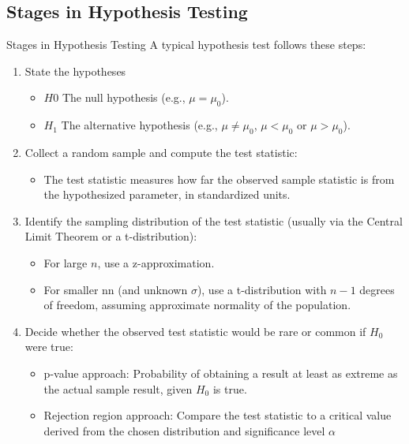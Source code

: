\documentclass[10pt]{extarticle}
\begin{document}
\subsection{Stages in Hypothesis Testing}
\begin{conceptbox}{Stages in Hypothesis Testing}{}
    A typical hypothesis test follows these steps:
    \begin{enumerate}
        \item State the hypotheses
              \begin{itemize}
                  \item $H0$ The null hypothesis (e.g., $\mu = \mu_0$).
                  \item $H_1$ The alternative hypothesis (e.g., $\mu \neq \mu_0$, $\mu < \mu_0$ or $\mu > \mu_0$).
              \end{itemize}
        \item  Collect a random sample and compute the test statistic:
              \begin{itemize}
                  \item The test statistic measures how far the observed sample statistic is from the hypothesized parameter, in standardized units.
              \end{itemize}
        \item Identify the sampling distribution of the test statistic (usually via the Central Limit Theorem or a t-distribution):
              \begin{itemize}
                  \item For large $n$, use a z-approximation.
                  \item For smaller nn (and unknown $\sigma$), use a t-distribution with $n-1$ degrees of freedom, assuming approximate normality of the population.
              \end{itemize}
        \item Decide whether the observed test statistic would be rare or common if $H_0$ were true:
              \begin{itemize}
                  \item p-value approach: Probability of obtaining a result at least as extreme as the actual sample result, given $H_0$ is true.
                  \item Rejection region approach: Compare the test statistic to a critical value derived from the chosen distribution and significance level $\alpha$
              \end{itemize}

\end{enumerate}
\end{conceptbox}
\end{document}
